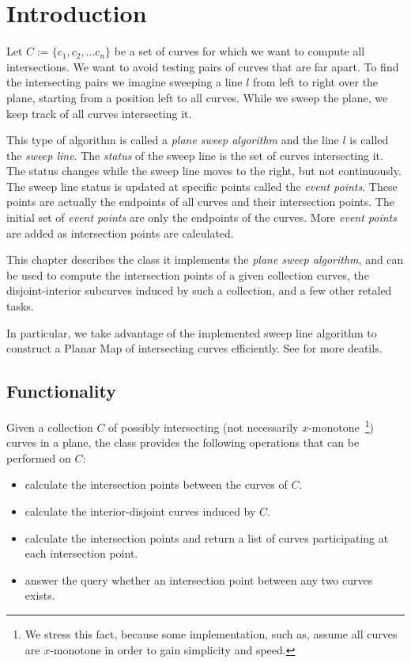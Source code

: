 \section{Introduction}

Let $C:=\{c_1,c_2, \ldots c_n\}$ be a set of curves for which we want 
to compute all intersections. We want to avoid testing pairs of curves 
that are far apart. To find the intersecting pairs we imagine sweeping  
a line $l$ from left to right over the plane, starting from a position 
left to all curves. While we sweep the plane, we keep track of all 
curves intersecting it.

This type of algorithm is called a {\em plane sweep algorithm} and the line 
$l$ is called the {\em sweep line}. The {\em status} of the sweep line is 
the set of curves intersecting it. The status changes while the sweep line 
moves to the right, but not continuously. The sweep line status is updated at 
specific points called the {\em event points}. These points are actually
the endpoints of all curves and their intersection points. The initial set of 
{\em event points} are only the endpoints of the curves. More
{\em event points} are added as intersection points are calculated.

This chapter describes the  class it implements the
{\em plane sweep algorithm}, and can be used to compute the
intersection points of a given collection curves, the disjoint-interior
subcurves induced by such a collection, and a few other retaled tasks.

In particular, we take advantage of the implemented sweep line algorithm to
construct a Planar Map of intersecting curves efficiently. See 
 for more deatils.

\subsection{Functionality}
Given a collection $C$ of possibly intersecting (not necessarily
$x$-monotone~\footnote{We stress this fact, because some implementation,
such as,  assume all curves are $x$-monotone 
in order to gain simplicity and speed.}) curves in a plane, the
 class provides the following operations that can be
performed on $C$:

\begin{itemize}
\item calculate the intersection points between the curves of $C$. 
\item calculate the interior-disjoint curves induced by $C$.
\item calculate the intersection points and return a list of curves 
  participating at each intersection point.
\item answer the query whether an intersection point between any two curves
  exists.
\end{itemize}

